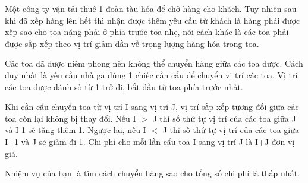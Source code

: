Một công ty vận tải thuê 1 đoàn tàu hỏa để chở hàng cho khách. Tuy nhiên sau khi đã xếp hàng lên hết thì nhận được thêm yêu cầu từ khách là hàng phải được xếp sao cho toa nặng phải ở phía trước toa nhẹ, nói cách khác là các toa phải được sắp xếp theo vị trí giảm dần về trọng lượng hàng hóa trong toa.  

   Các toa đã được niêm phong nên không thể chuyển hàng giữa các toa được. Cách duy nhất là yêu cầu nhà ga dùng 1 chiếc cần cẩu để chuyển vị trí các toa. Vị trí các toa được đánh số từ 1 trở đi, bắt đầu từ toa phía trước nhất.  

   Khi cần cẩu chuyển toa từ vị trí I sang vị trí J, vị trí sắp xếp tương đối giữa các toa còn lại không bị thay đổi. Nếu I $>$ J thì số thứ tự vị trí của các toa giữa J và I-1 sẽ tăng thêm 1. Ngược lại, nếu I $<$ J thì số thứ tự vị trí của các toa giữa I+1 và J sẽ giảm đi 1. Chi phí cho mỗi lần cẩu toa I sang vị trí J là I+J đơn vị giá.  

   Nhiệm vụ của bạn là tìm cách chuyển hàng sao cho tổng số chi phí là thấp nhất.  

\
